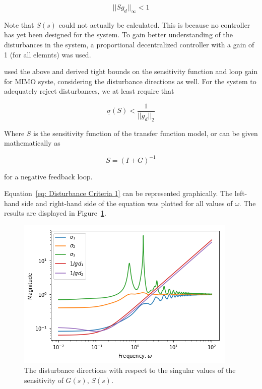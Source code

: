 \begin{equation}
	||Sg_d||_{\infty} < 1
\end{equation}

Note that $S(s)$ could not actually be calculated. This is because no controller has yet been designed for the system. To gain better understanding of the disturbances in the system, a proportional decentralized controller with a gain of 1 (for all elemnts) was used.

\textcite{skogestad} used the above and derived tight bounds on the sensitivity function and loop gain for MIMO syste, considering the disturbance directions as well. For the system to adequately reject disturbances, we at least require that 

\begin{equation}
	\label{eq: Disturbance Criteria 1}
	\underline{\sigma}(S) < \frac{1}{||g_d||_2}
\end{equation}

Where $S$ is the sensitivity function of the transfer function model, or can be given mathematically as 

\begin{equation}
	S = (I + G)^{-1}
\end{equation}

for a negative feedback loop.

Equation~\ref{eq: Disturbance Criteria 1} can be represented graphically. The left-hand side and right-hand side of the equation was plotted for all values of $\omega$. The results are displayed in Figure~\ref{fig:disturbance-analysis-1}.

\begin{figure}[H]
	\centering
	\includegraphics[width=0.7\linewidth]{"Figures/Disturbance Analysis 1"}
	\caption{The disturbance directions with respect to the singular values of the sensitivity of $G(s)$, $S(s)$.}
	\label{fig:disturbance-analysis-1}
\end{figure}

